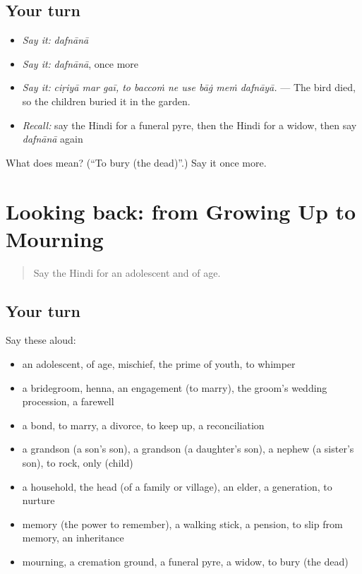 \subsection*{Your turn}
\begin{itemize}
\raggedright
  \item \emph{Say it:} \emph{dafnānā}
  \item \emph{Say it:} \emph{dafnānā}, once more
  \item \emph{Say it:} \emph{ciṛiyā mar gaī, to baccoṁ ne use bāġ meṁ dafnāyā.} — The bird died, so the children buried it in the garden.
  \item \emph{Recall:} say the Hindi for a funeral pyre, then the Hindi for a widow, then say \emph{dafnānā} again
\end{itemize}

\begin{tcolorbox}[breakable,colback=teal!4,colframe=teal!35!black,title={Before you move on}]
What does  mean? (\textquotedblleft{}To bury (the dead)\textquotedblright{}.) Say it once more.
\end{tcolorbox}
\section[(dialogue)]{Looking back: from Growing Up to Mourning}

\label{lesson:HI-R505-review-499-505}



\begin{quote}
Say the Hindi for an adolescent and of age.
\end{quote}

\subsection*{Your turn}
Say these aloud:

\begin{itemize}
\raggedright
  \item an adolescent, of age, mischief, the prime of youth, to whimper
  \item a bridegroom, henna, an engagement (to marry), the groom's wedding procession, a farewell
  \item a bond, to marry, a divorce, to keep up, a reconciliation
  \item a grandson (a son's son), a grandson (a daughter's son), a nephew (a sister's son), to rock, only (child)
  \item a household, the head (of a family or village), an elder, a generation, to nurture
  \item memory (the power to remember), a walking stick, a pension, to slip from memory, an inheritance
  \item mourning, a cremation ground, a funeral pyre, a widow, to bury (the dead)
\end{itemize}

